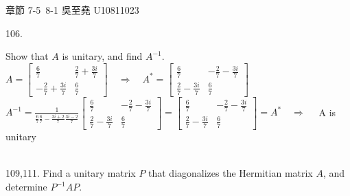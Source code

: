 \documentclass[12pt]{book}
\author{andersonwu2000}
\begin{document}
\begin{CJK}{UTF8}{bsmi}

\hfill 章節 7-5~8-1 吳至堯 U10811023


106. \begin{minipage}[t]{\dimexpr\linewidth-2em}
Show that $A$ is unitary, and find $A^{-1}$. \\
$\displaystyle A=\begin{bmatrix}
\frac{6}{7} & \frac{2}{7}+\frac{3i}{7} \\
-\frac{2}{7}+\frac{3i}{7} & \frac{6}{7}
\end{bmatrix}\quad\Rightarrow\quad A^*=\begin{bmatrix}
\frac{6}{7} & -\frac{2}{7}-\frac{3i}{7} \\
\frac{2}{7}-\frac{3i}{7} & \frac{6}{7}
\end{bmatrix}$ \\
$\displaystyle A^{-1}=\frac{1}{\frac{6}{7}\frac{6}{7}-\frac{3i+2}{7}\frac{3i-2}{7}}\begin{bmatrix}
\frac{6}{7} & -\frac{2}{7}-\frac{3i}{7} \\
\frac{2}{7}-\frac{3i}{7} & \frac{6}{7}
\end{bmatrix}=\begin{bmatrix}
\frac{6}{7} & -\frac{2}{7}-\frac{3i}{7} \\
\frac{2}{7}-\frac{3i}{7} & \frac{6}{7}
\end{bmatrix}=A^*\quad\Rightarrow\quad$ A is unitary
\end{minipage}\\

109,111. 
Find a unitary matrix $P$ that diagonalizes the Hermitian matrix $A$, and determine $P^{-1}AP$.


\end{CJK}
\end{document}
